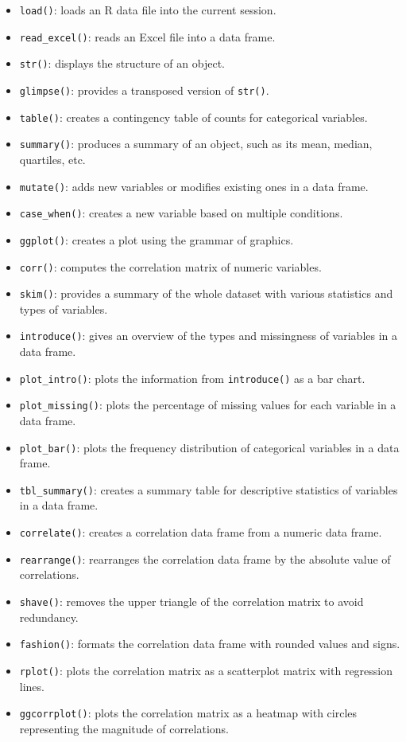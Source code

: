 \documentclass[
]{book}
\providecommand{\tightlist}{%
  \setlength{\itemsep}{0pt}\setlength{\parskip}{0pt}}
\begin{document}
\begin{itemize}
\tightlist
\item
  \texttt{load()}: loads an R data file into the current session.
\item
  \texttt{read\_excel()}: reads an Excel file into a data frame.
\item
  \texttt{str()}: displays the structure of an object.
\item
  \texttt{glimpse()}: provides a transposed version of \texttt{str()}.
\item
  \texttt{table()}: creates a contingency table of counts for categorical variables.
\item
  \texttt{summary()}: produces a summary of an object, such as its mean, median, quartiles, etc.
\item
  \texttt{mutate()}: adds new variables or modifies existing ones in a data frame.
\item
  \texttt{case\_when()}: creates a new variable based on multiple conditions.
\item
  \texttt{ggplot()}: creates a plot using the grammar of graphics.
\item
  \texttt{corr()}: computes the correlation matrix of numeric variables.
\item
  \texttt{skim()}: provides a summary of the whole dataset with various statistics and types of variables.
\item
  \texttt{introduce()}: gives an overview of the types and missingness of variables in a data frame.
\item
  \texttt{plot\_intro()}: plots the information from \texttt{introduce()} as a bar chart.
\item
  \texttt{plot\_missing()}: plots the percentage of missing values for each variable in a data frame.
\item
  \texttt{plot\_bar()}: plots the frequency distribution of categorical variables in a data frame.
\item
  \texttt{tbl\_summary()}: creates a summary table for descriptive statistics of variables in a data frame.
\item
  \texttt{correlate()}: creates a correlation data frame from a numeric data frame.
\item
  \texttt{rearrange()}: rearranges the correlation data frame by the absolute value of correlations.
\item
  \texttt{shave()}: removes the upper triangle of the correlation matrix to avoid redundancy.
\item
  \texttt{fashion()}: formats the correlation data frame with rounded values and signs.
\item
  \texttt{rplot()}: plots the correlation matrix as a scatterplot matrix with regression lines.
\item
  \texttt{ggcorrplot()}: plots the correlation matrix as a heatmap with circles representing the magnitude of correlations.
\end{itemize}
\end{document}

